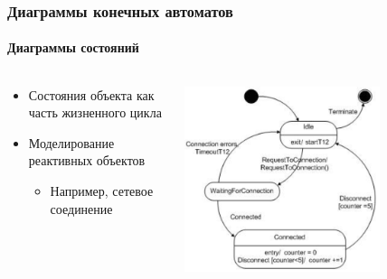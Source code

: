\documentclass[xetex,mathserif,serif]{beamer}
\begin{document}
	\begin{frame}
		\frametitle{Диаграммы конечных автоматов}
		\framesubtitle{Диаграммы состояний}
		\begin{columns}
			\begin{column}{0.4\textwidth}
				\begin{itemize}
					\item Состояния объекта как часть жизненного цикла
					\item Моделирование реактивных объектов
					\begin{itemize}
						\item Например, сетевое соединение
					\end{itemize}
				\end{itemize}
			\end{column}
			\begin{column}{0.6\textwidth}
				\begin{center}
					\includegraphics[width=0.7\textwidth]{stateTransitionExample.png}
				\end{center}
			\end{column}
		\end{columns}
	\end{frame}
\end{document}
